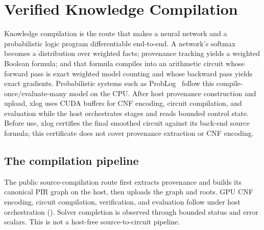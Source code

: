 \section{Verified Knowledge Compilation}\label{sec:prob}

Knowledge compilation is the route that makes a neural network and a probabilistic logic program differentiable end-to-end. A network's softmax becomes a distribution over weighted facts; provenance tracking yields a weighted Boolean formula; and that formula compiles into an arithmetic circuit whose forward pass is exact weighted model counting and whose backward pass yields exact gradients. Probabilistic systems such as ProbLog~\cite{problog2} follow this compile-once/evaluate-many model on the CPU. After host provenance construction and upload, xlog uses CUDA buffers for CNF encoding, circuit compilation, and evaluation while the host orchestrates stages and reads bounded control state. Before use, xlog certifies the final smoothed circuit against its back-end source formula; this certificate does not cover provenance extraction or CNF encoding.

\subsection{The compilation pipeline}

The public source-compilation route first extracts provenance and builds its canonical PIR graph on the host, then uploads the graph and roots. GPU CNF encoding, circuit compilation, verification, and evaluation follow under host orchestration (). Solver completion is observed through bounded status and error scalars. This is not a host-free source-to-circuit pipeline.

